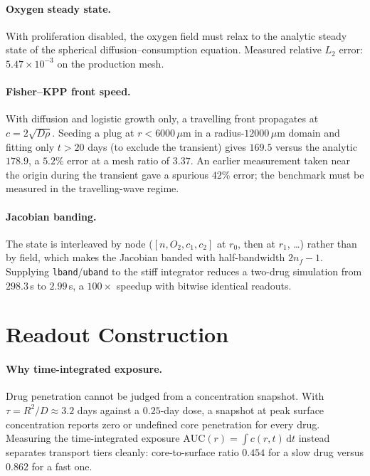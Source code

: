 \documentclass{article}
\begin{document}
\paragraph{Oxygen steady state.} With proliferation disabled, the oxygen field
must relax to the analytic steady state of the spherical diffusion--consumption
equation. Measured relative $L_2$ error: $5.47 \times 10^{-3}$ on the
production mesh.

\paragraph{Fisher--KPP front speed.} With diffusion and logistic growth only,
a travelling front propagates at $c = 2\sqrt{D\rho}$. Seeding a plug at
$r < 6000\,\mu$m in a radius-$12000\,\mu$m domain and fitting only $t > 20$
days (to exclude the transient) gives $169.5$ versus the analytic $178.9$, a
$5.2\%$ error at a mesh ratio of $3.37$. An earlier measurement taken near
the origin during the transient gave a spurious $42\%$ error; the benchmark
must be measured in the travelling-wave regime.

\paragraph{Jacobian banding.} The state is interleaved by node
($[n, O_2, c_1, c_2]$ at $r_0$, then at $r_1$, \ldots) rather than by field,
which makes the Jacobian banded with half-bandwidth $2n_f - 1$. Supplying
\texttt{lband}/\texttt{uband} to the stiff integrator reduces a two-drug
simulation from $298.3$\,s to $2.99$\,s, a $100\times$ speedup with bitwise
identical readouts.

\section{Readout Construction}
\label{app:readouts}

\paragraph{Why time-integrated exposure.} Drug penetration cannot be judged
from a concentration snapshot. With $\tau = R^2/D \approx 3.2$ days against a
$0.25$-day dose, a snapshot at peak surface concentration reports zero or
undefined core penetration for every drug. Measuring the time-integrated
exposure $\mathrm{AUC}(r) = \int c(r,t)\,\mathrm{d}t$ instead separates
transport tiers cleanly: core-to-surface ratio $0.454$ for a slow drug versus
$0.862$ for a fast one.
\end{document}
